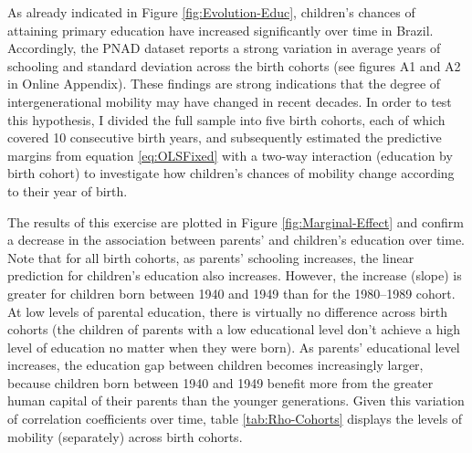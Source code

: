 \documentclass[a4paper, 12pt]{article}
\let\footnote=\endnote
\begin{document}




As already indicated in Figure \ref{fig:Evolution-Educ}, children’s chances of attaining primary education have increased significantly over time in Brazil. Accordingly, the PNAD dataset reports a strong variation in average years of schooling and standard deviation across the birth cohorts (see figures A1 and A2 in Online Appendix). These findings are strong indications that the degree of intergenerational mobility may have changed in recent decades. In order to test this hypothesis, I divided the full sample into five birth cohorts, each of which covered 10 consecutive birth years, and subsequently estimated the predictive margins from equation \eqref{eq:OLSFixed} with a two-way interaction (education by birth cohort) to investigate how children’s chances of mobility change according to their year of birth.

The results of this exercise are plotted in Figure \ref{fig:Marginal-Effect} and confirm a decrease in the association between parents’ and children’s education over time. Note that for all birth cohorts, as parents’ schooling increases, the linear prediction for children’s education also increases. However, the increase (slope) is greater for children born between 1940 and 1949 than for the 1980–1989 cohort. At low levels of parental education, there is virtually no difference across birth cohorts (the children of parents with a low educational level don’t achieve a high level of education no matter when they were born). As parents’ educational level increases, the education gap between children becomes increasingly larger, because children born between 1940 and 1949 benefit more from the greater human capital of their parents than the younger generations. Given this variation of correlation coefficients over time, table \ref{tab:Rho-Cohorts} displays the levels of mobility (separately) across birth cohorts.
\end{document}
